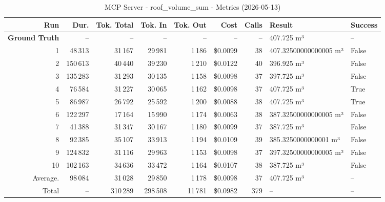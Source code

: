 \documentclass[a4paper,11pt]{article}
\begin{document}
\begin{table}[ht]
\centering
\scriptsize
\caption{MCP Server - roof\_volume\_sum - Metrics (2026-05-13)}
\label{tab:mcp\_roof\_volume\_sum\_metrics\_2026-05-13}
\begin{tabular}{r r r r r r r p{3cm} l}
\hline
Run & Dur. & Tok. Total & Tok. In & Tok. Out & Cost & Calls & Result & Success \\
\hline
\textbf{Ground Truth} & -- & -- & -- & -- & -- & -- & 407.725 m³ & -- \\
\hline
1 & 48\,313 & 31\,167 & 29\,981 & 1\,186 & \$0.0099 & 38 & 407.32500000000005 m³ & False \\
2 & 150\,613 & 40\,440 & 39\,230 & 1\,210 & \$0.0122 & 40 & 396.925 m³ & False \\
3 & 135\,283 & 31\,293 & 30\,135 & 1\,158 & \$0.0098 & 37 & 397.725 m³ & False \\
4 & 76\,584 & 31\,227 & 30\,065 & 1\,162 & \$0.0098 & 37 & 407.725 m³ & True \\
5 & 86\,987 & 26\,792 & 25\,592 & 1\,200 & \$0.0088 & 38 & 407.725 m³ & True \\
6 & 122\,297 & 17\,164 & 15\,990 & 1\,174 & \$0.0063 & 38 & 387.32500000000005 m³ & False \\
7 & 41\,388 & 31\,347 & 30\,167 & 1\,180 & \$0.0099 & 37 & 387.725 m³ & False \\
8 & 92\,385 & 35\,107 & 33\,913 & 1\,194 & \$0.0109 & 39 & 385.3250000000001 m³ & False \\
9 & 124\,832 & 31\,116 & 29\,963 & 1\,153 & \$0.0098 & 37 & 397.32500000000005 m³ & False \\
10 & 102\,163 & 34\,636 & 33\,472 & 1\,164 & \$0.0107 & 38 & 387.725 m³ & False \\
\hline
Average. & 98\,084 & 31\,028 & 29\,850 & 1\,178 & \$0.0098 & 37 & 407.725 m³ & -- \\
Total & -- & 310\,289 & 298\,508 & 11\,781 & \$0.0982 & 379 & -- & -- \\
\hline
\end{tabular}
\end{table}

\clearpage
\end{document}
